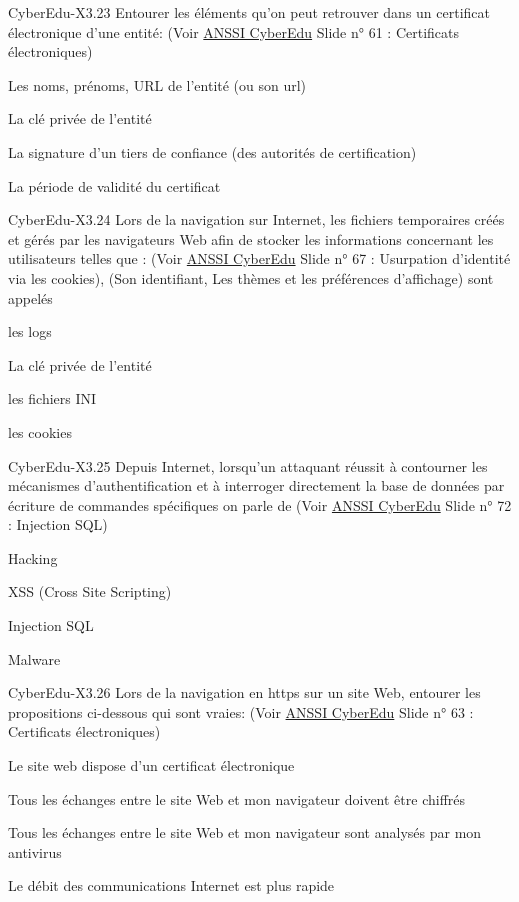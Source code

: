 \begin{multi}[multiple=true]{CyberEdu-X3.23}
	Entourer les éléments qu'on peut retrouver dans un certificat électronique d'une entité: (Voir \href{https://www.ssi.gouv.fr/administration/formations/cyberedu/contenu-pedagogique-cyberedu/}{ANSSI CyberEdu} Slide n° 61 : Certificats électroniques)
\item* Les noms, prénoms, URL de l'entité (ou son url)
\item La clé privée de l'entité
\item* La signature d'un tiers de confiance (des autorités de certification)
\item* La période de validité du certificat
\end{multi}
\begin{multi}[multiple=true]{CyberEdu-X3.24}
	Lors de la navigation sur Internet, les  fichiers temporaires créés et gérés par les navigateurs Web afin de stocker les informations concernant les utilisateurs telles que : (Voir \href{https://www.ssi.gouv.fr/administration/formations/cyberedu/contenu-pedagogique-cyberedu/}{ANSSI CyberEdu} Slide n° 67 : Usurpation d'identité via les cookies), (Son identifiant, Les thèmes et les préférences d'affichage) sont appelés
\item les logs
\item La clé privée de l'entité
\item les fichiers INI
\item* les cookies
\end{multi}
\begin{multi}[multiple=true]{CyberEdu-X3.25}
	Depuis Internet, lorsqu'un attaquant réussit à contourner les mécanismes d'authentification et à interroger directement la base de données  par écriture de commandes spécifiques on parle de (Voir \href{https://www.ssi.gouv.fr/administration/formations/cyberedu/contenu-pedagogique-cyberedu/}{ANSSI CyberEdu} Slide n° 72 : Injection SQL)
\item Hacking
\item XSS (Cross Site Scripting)
\item* Injection SQL
\item Malware
\end{multi}
\begin{multi}[multiple=true]{CyberEdu-X3.26}
	Lors de la navigation en https sur un site Web, entourer les propositions ci-dessous qui sont vraies: (Voir \href{https://www.ssi.gouv.fr/administration/formations/cyberedu/contenu-pedagogique-cyberedu/}{ANSSI CyberEdu} Slide n° 63 : Certificats électroniques)
\item* Le site web dispose d'un certificat électronique
\item* Tous les échanges entre le site Web et mon navigateur doivent être chiffrés
\item Tous les échanges entre le site Web et mon navigateur sont analysés par mon antivirus
\item Le débit des communications Internet est plus rapide
\end{multi}
